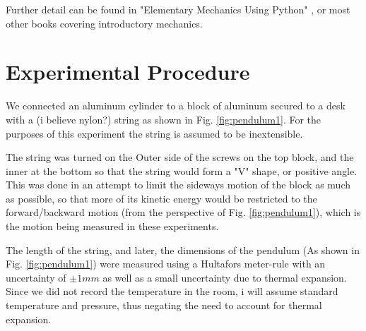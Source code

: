 \documentclass[%
 reprint,
 amsmath,amssymb,
 aps,
]{revtex4-1}
\begin{document}
	Further detail can be found in "Elementary Mechanics Using Python" \cite{elempy}, or most other books covering introductory mechanics.

\section{\label{section:experimentalproced}Experimental Procedure}
    
    We connected an aluminum cylinder to a block of aluminum secured to a desk with a (i believe nylon?) string as shown in Fig. \ref{fig:pendulum1}. For the purposes of this experiment the string is assumed to be inextensible. 

    The string was turned on the Outer side of the screws on the top block, and the inner at the bottom so that the string would form a "V" shape, or positive angle. This was done in an attempt to limit the sideways motion of the block as much as possible, so that more of its kinetic energy would be restricted to the forward/backward motion (from the perspective of Fig. \ref{fig:pendulum1}), which is the motion being measured in these experiments.

    The length of the string, and later, the dimensions of the pendulum (As shown in Fig. \ref{fig:pendulum1}) were measured using a Hultafors meter-rule with an uncertainty of $\pm 1mm$ as well as a small uncertainty due to thermal expansion. Since we did not record the temperature in the room, i will assume standard temperature and pressure, thus negating the need to account for thermal expansion.
\end{document}
